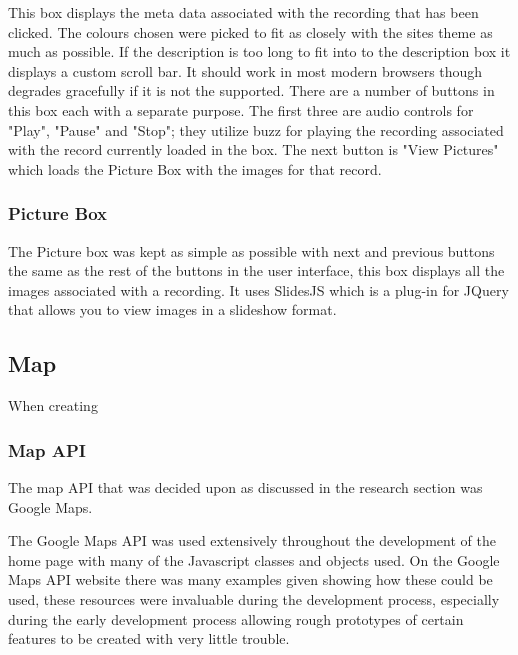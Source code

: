 \documentclass{l3proj}
\begin{document}
This box displays the meta data associated with the recording that has been clicked. The colours chosen were picked to fit as closely with the sites theme as much as possible. If the description is too long to fit into to the description box it displays a custom  scroll bar. It should work in most modern browsers though degrades gracefully if it is not the supported. There are a number of buttons in this box each with a separate purpose. The first three are audio controls for "Play", "Pause" and "Stop"; they utilize buzz for playing the recording associated with the record currently loaded in the box. The next button is "View Pictures" which loads the Picture Box with the images for that record.

\subsubsection{Picture Box}

The Picture box was kept as simple as possible with next and previous buttons the same as the rest of the buttons in the user interface, this box displays all the images associated with a recording. It uses SlidesJS which is a plug-in for JQuery that allows you to view images in a slideshow format.

\subsection{Map}

When creating

\subsubsection{Map API}

The map API that was decided upon as discussed in the research section was Google Maps.

The Google Maps API was used extensively throughout the development of the home page with many of the Javascript classes and objects used. On the Google Maps API website there was many examples given showing how these could be used, these resources were invaluable during the development process, especially during the early development process allowing rough prototypes of certain features to be created with very little trouble.
\end{document}
